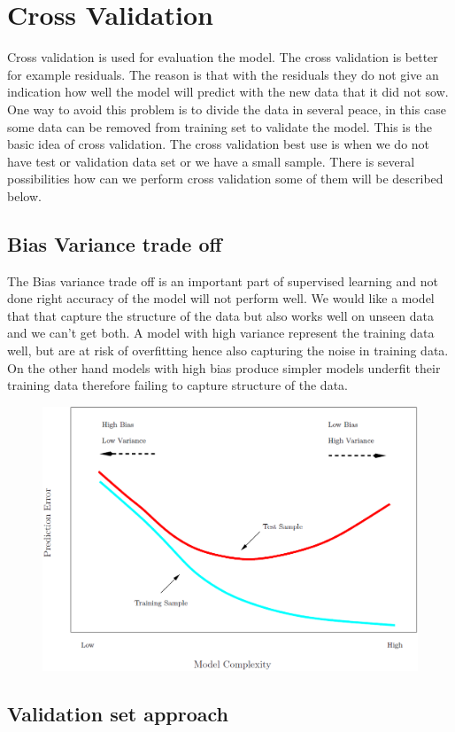 \chapter{Cross Validation} \label{ch:crossValidation}
Cross validation is used for evaluation the model. The cross validation is better for example residuals. The reason is that with the residuals they do not give an indication how well the model will predict with the new data that it did not sow. One way to avoid this problem is to divide the data in several peace, in this case some data can be removed from training set to validate the model. This is the basic idea of cross validation. The cross validation best use is when we do not have test or validation data set or we have a small sample. There is several possibilities how can we perform cross validation some of them will be described below.

\section {Bias Variance trade off}
The Bias variance trade off is an important part of supervised learning and not done right accuracy of the model will not perform well. We would like a model that that capture the structure of the data but also works well on unseen data and we can't get both. A model with high variance represent the training data well, but are at risk of overfitting hence also capturing the noise in training data. On the other hand models with high bias produce simpler models underfit their training data therefore failing to capture structure of the data.

\begin{figure}
	\centering
	\includegraphics[width=0.5\linewidth]{crossValidation/biasVariance}
	\caption{}
	\label{fig:biasvariance}
\end{figure}

\section {Validation set approach}
